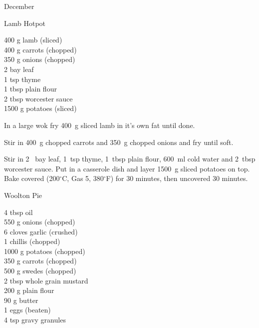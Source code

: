 \begin{menu}{December}
    \begin{recipe}{2}{Lamb Hotpot}%
		\begin{ingredients}
		400 g lamb (sliced) \\
	400 g carrots (chopped) \\
	350 g onions (chopped) \\
	2  bay leaf  \\
	1 tsp thyme  \\
	1 tbsp plain flour  \\
	2 tbsp worcester sauce  \\
	1500 g potatoes (sliced) \\
	
		\end{ingredients}
	
	
    \begin{instructions}
    \item 
        In a large wok fry
        400~g sliced lamb
        in it's own fat until done.
      \item 
        Stir in
        400~g chopped carrots
        and
        350~g chopped onions
        and fry until soft.
      \item 
        Stir in
        2~  bay leaf,
        1~tsp  thyme,
        1~tbsp  plain flour,
        600~ml  cold water
        and
        2~tbsp  worcester sauce.
        Put in a casserole dish and
        layer 1500~g sliced potatoes on top.
        Bake covered (200$^{\circ}$C, Gas 5, 380$^{\circ}$F)
        for 30 minutes,
        then uncovered 30 minutes.
      
    \end{instructions}
    \end{recipe}%
  
    \begin{recipe}{2}{Woolton Pie}%
		\begin{ingredients}
		4 tbsp oil  \\
	550 g onions (chopped) \\
	6 cloves garlic (crushed) \\
	1  chillis (chopped) \\
	1000 g potatoes (chopped) \\
	350 g carrots (chopped) \\
	500 g swedes (chopped) \\
	2 tbsp whole grain mustard  \\
	200 g plain flour  \\
	90 g butter  \\
	1  eggs (beaten) \\
	4 tsp gravy granules  \\
	

\end{ingredients}
\end{recipe}
\end{menu}
